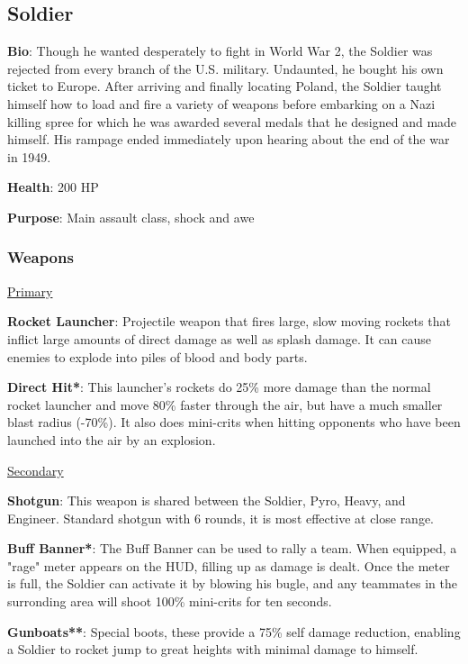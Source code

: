 \subsection{Soldier}
\label{Soldier}
{\bf Bio}:
Though he wanted desperately to fight in World War 2, the Soldier was rejected from every branch of the U.S. military. Undaunted, he bought his own ticket to Europe. After arriving and finally locating Poland, the Soldier taught himself how to load and fire a variety of weapons before embarking on a Nazi killing spree for which he was awarded several medals that he designed and made himself. His rampage ended immediately upon hearing about the end of the war in 1949.

{\bf Health}: 200 HP

{\bf Purpose}:
Main assault class, shock and awe

\subsubsection {Weapons}

\begin {center}
\underline {Primary}
\end {center}

{\bf Rocket Launcher}: Projectile weapon that fires large, slow moving rockets that inflict large amounts of direct damage as well as splash damage. It can cause enemies to explode into piles of blood and body parts. 

{\bf Direct Hit*}: This launcher's rockets do 25\% more damage than the normal rocket launcher and move 80\% faster through the air, but have a much smaller blast radius (-70\%). It also does mini-crits when hitting opponents who have been launched into the air by an explosion.

\begin {center}
\underline {Secondary}
\end {center}

{\bf Shotgun}: This weapon is shared between the Soldier, Pyro, Heavy, and Engineer. Standard shotgun with 6 rounds, it is most effective at close range. 

{\bf Buff Banner*}: The Buff Banner can be used to rally a team.  When equipped, a "rage" meter appears on the HUD, filling up as damage is dealt.  Once the meter is full, the Soldier can activate it by blowing his bugle, and any teammates in the surronding area will shoot 100\% mini-crits for ten seconds.

{\bf Gunboats**}: Special boots, these provide a 75\% self damage reduction, enabling a Soldier to rocket jump to great heights with minimal damage to himself.

